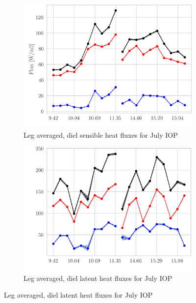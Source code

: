 \documentclass[draft]{agujournal2019}
\begin{document}
 \begin{figure}[hbtp]
 \begin{subfigure}{0.49\textwidth}
     \includegraphics[width=\textwidth]{figures_main/H_IOP01_diel.png}
     \caption{Leg averaged, diel sensible heat fluxes for July IOP }
     \label{fig:H_IOP01_diel}
 \end{subfigure}
 \hfill
 \begin{subfigure}{0.49\textwidth}
     \includegraphics[width=\textwidth]{figures_main/LE_IOP01_diel.png}
     \caption{Leg averaged, diel latent heat fluxes for July IOP}
     \label{fig:LE_IOP01_diel}
 \end{subfigure}
 

\end{figure}
\end{document}
